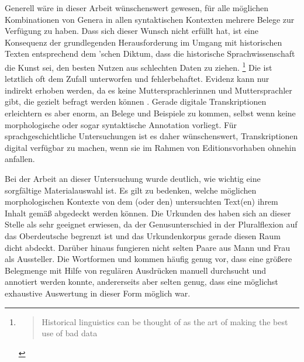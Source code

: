 Generell wäre in dieser Arbeit wünschenswert gewesen, für alle möglichen
Kombinationen von Genera in allen syntaktischen Kontexten mehrere
Belege zur Verfügung zu haben. Dass sich dieser Wunsch nicht erfüllt hat, ist
eine Konsequenz der grundlegenden Herausforderung im Umgang mit historischen
Texten entsprechend dem \citeauthor{labov1994}'schen Diktum, dass die
historische Sprachwissenschaft die Kunst sei, den besten Nutzen aus schlechten
Daten zu ziehen.%
%
	\footnote{\foreignblockcquote{english}[11]{labov1994}{Historical
		linguistics can \textelp{} be thought of as the art of making the best
		use of bad data}.%
	}
%
Die  ist letztlich oft dem Zufall unterworfen und
fehlerbehaftet. Evidenz kann nur indirekt erhoben werden, da es keine
Muttersprachlerinnen und Muttersprachler gibt, die gezielt befragt werden
können \autocite[11]{labov1994}. Gerade digitale
Transkriptionen erleichtern es aber enorm, an Belege und
Beispiele zu kommen, selbst wenn keine morphologische oder sogar syntaktische
Annotation vorliegt.
Für sprachgeschichtliche Untersuchungen ist es daher
wünschenswert, Transkriptionen digital verfügbar zu machen, wenn sie im Rahmen
von Editionsvorhaben ohnehin anfallen.

Bei der Arbeit an dieser Untersuchung wurde deutlich, wie wichtig eine
sorgfältige Material\-auswahl ist. Es gilt zu bedenken, welche möglichen
morphologischen Kontexte von dem (oder den) untersuchten Text(en) ihrem Inhalt
gemäß abgedeckt werden können. Die Urkunden des \CAO{} haben sich
an dieser Stelle als sehr geeignet erwiesen, da der Genusunterschied in der
Pluralflexion auf das Oberdeutsche begrenzt ist und das
Urkundenkorpus gerade diesen Raum dicht abdeckt. Darüber
hinaus fungieren nicht selten Paare aus Mann und Frau als Aussteller. Die
Wortformen  und   kommen häufig genug vor,
dass eine größere Belegmenge mit Hilfe von regulären Ausdrücken manuell durchsucht und annotiert werden konnte, andererseits aber
selten genug, dass eine möglichst exhaustive Auswertung in dieser Form möglich
war.

